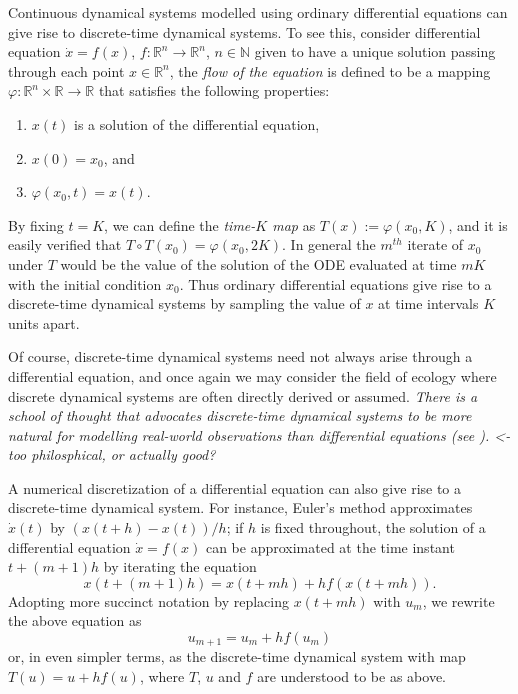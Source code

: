 \documentclass[12 pt]{article}
\begin{document}
Continuous dynamical systems modelled using ordinary differential equations can give rise to discrete-time dynamical systems. To see this, consider differential equation $\dot{x} = f(x)$, $f: \mathbb{R}^n \to \mathbb{R}^n$, $n\in\mathbb{N}$ given to have a unique solution passing through 
each point $x\in\mathbb{R}^{n}$, the \emph{flow of the equation}\label{defn_flow} is defined to be a mapping $\varphi: \mathbb{R}^n \times \mathbb{R} \to \mathbb{R}$ that satisfies the following properties:
\vspace{-8mm}
\begin{enumerate}[noitemsep, label=\roman*.]
  \item $x(t)$ is a solution of the differential equation,
  \item $x(0)=x_0$, and
  \item $\varphi(x_0,t) = x(t)$.
\end{enumerate}
By fixing $t=K$, we can define the \emph{time-$K$ map} as  $T(x):= \varphi(x_0,K)$, and it is easily verified that $T\circ T(x_0) = \varphi(x_0,2K)$. In general the $m^{th}$ iterate of $x_0$ under $T$ would be the value of the solution of the ODE evaluated at time $mK$ with the initial condition $x_0$. 
Thus ordinary differential equations give rise to a discrete-time dynamical systems by sampling the value of $x$ at time intervals $K$ units apart. 

Of course, discrete-time dynamical systems need not always arise through a differential equation, and once again we may consider the field of ecology where discrete dynamical systems are often directly derived or assumed. 
\emph{There is a school of thought that advocates discrete-time dynamical systems to be more natural for modelling real-world observations than differential equations (see \cite{saber2010introduction}).  <- too philosphical, or actually good?}

A numerical discretization of a differential equation can also give rise to a discrete-time dynamical system. For instance, Euler's method approximates $\dot{x}(t)$ by $(x(t+h)-x(t))/h$; if $h$ is fixed throughout, the solution of a differential equation $\dot{x}=f(x)$ 
can be approximated at the time instant $t+(m+1)h$ by iterating the equation 
$$x(t+(m+1)h) = x(t+mh) + h f(x(t+mh)).$$ 
Adopting more succinct notation by replacing $x(t+mh)$ with $u_m$, we rewrite the above equation as
$$u_{m+1} = u_m + hf(u_m)$$
or, in even simpler terms, as the discrete-time dynamical system with map $T(u) = u + hf(u)$, where $T$, $u$ and $f$ are understood to be as above.
\end{document}
